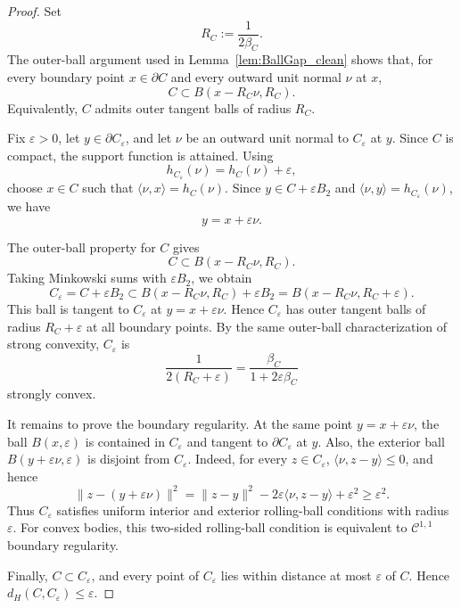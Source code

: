 \documentclass{article}
\begin{document}
\begin{proof}
Set
\[
    R_C:=\frac{1}{2\beta_C}.
\]
The outer-ball argument used in Lemma~\ref{lem:BallGap_clean} shows that, for
every boundary point \(x\in\partial C\) and every outward unit normal \(\nu\) at
\(x\),
\[
    C\subset B(x-R_C\nu,R_C).
\]
Equivalently, \(C\) admits outer tangent balls of radius \(R_C\).

Fix \(\varepsilon>0\), let \(y\in\partial C_\varepsilon\), and let \(\nu\) be an
outward unit normal to \(C_\varepsilon\) at \(y\). Since \(C\) is compact, the
support function is attained. Using
\[
    h_{C_\varepsilon}(\nu)=h_C(\nu)+\varepsilon,
\]
choose \(x\in C\) such that \(\langle \nu,x\rangle=h_C(\nu)\). Since
\(y\in C+\varepsilon B_2\) and
\(\langle \nu,y\rangle=h_{C_\varepsilon}(\nu)\), we have
\[
    y=x+\varepsilon\nu .
\]

The outer-ball property for \(C\) gives
\[
    C\subset B(x-R_C\nu,R_C).
\]
Taking Minkowski sums with \(\varepsilon B_2\), we obtain
\[
    C_\varepsilon
    =
    C+\varepsilon B_2
    \subset
    B(x-R_C\nu,R_C)+\varepsilon B_2
    =
    B(x-R_C\nu,R_C+\varepsilon).
\]
This ball is tangent to \(C_\varepsilon\) at \(y=x+\varepsilon\nu\). Hence
\(C_\varepsilon\) has outer tangent balls of radius \(R_C+\varepsilon\) at all
boundary points. By the same outer-ball characterization of strong convexity,
\(C_\varepsilon\) is
\[
    \frac{1}{2(R_C+\varepsilon)}
    =
    \frac{\beta_C}{1+2\varepsilon\beta_C}
\]
strongly convex.

It remains to prove the boundary regularity. At the same point
\(y=x+\varepsilon\nu\), the ball \(B(x,\varepsilon)\) is contained in
\(C_\varepsilon\) and tangent to \(\partial C_\varepsilon\) at \(y\). Also, the
exterior ball \(B(y+\varepsilon\nu,\varepsilon)\) is disjoint from
\(C_\varepsilon\). Indeed, for every \(z\in C_\varepsilon\),
\(\langle\nu,z-y\rangle\le0\), and hence
\[
    \|z-(y+\varepsilon\nu)\|^2
    =
    \|z-y\|^2
    -2\varepsilon\langle\nu,z-y\rangle
    +\varepsilon^2
    \ge
    \varepsilon^2 .
\]
Thus \(C_\varepsilon\) satisfies uniform interior and exterior rolling-ball
conditions with radius \(\varepsilon\). For convex bodies, this two-sided
rolling-ball condition is equivalent to \(\mathcal C^{1,1}\) boundary regularity.

Finally, \(C\subset C_\varepsilon\), and every point of \(C_\varepsilon\) lies
within distance at most \(\varepsilon\) of \(C\). Hence
\(d_H(C,C_\varepsilon)\le\varepsilon\).
\end{proof}
\end{document}
